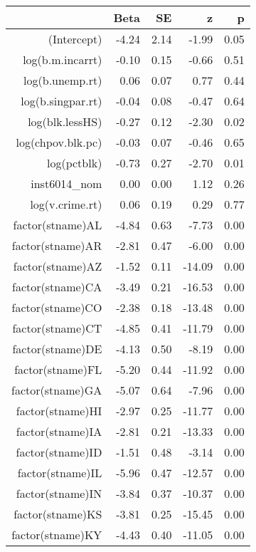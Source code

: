 \begin{table}[ht]
\centering
\begin{tabular}{rrrrr}
  \hline
 & Beta & SE & z & p \\ 
  \hline
(Intercept) & -4.24 & 2.14 & -1.99 & 0.05 \\ 
  log(b.m.incarrt) & -0.10 & 0.15 & -0.66 & 0.51 \\ 
  log(b.unemp.rt) & 0.06 & 0.07 & 0.77 & 0.44 \\ 
  log(b.singpar.rt) & -0.04 & 0.08 & -0.47 & 0.64 \\ 
  log(blk.lessHS) & -0.27 & 0.12 & -2.30 & 0.02 \\ 
  log(chpov.blk.pc) & -0.03 & 0.07 & -0.46 & 0.65 \\ 
  log(pctblk) & -0.73 & 0.27 & -2.70 & 0.01 \\ 
  inst6014\_nom & 0.00 & 0.00 & 1.12 & 0.26 \\ 
  log(v.crime.rt) & 0.06 & 0.19 & 0.29 & 0.77 \\ 
  factor(stname)AL & -4.84 & 0.63 & -7.73 & 0.00 \\ 
  factor(stname)AR & -2.81 & 0.47 & -6.00 & 0.00 \\ 
  factor(stname)AZ & -1.52 & 0.11 & -14.09 & 0.00 \\ 
  factor(stname)CA & -3.49 & 0.21 & -16.53 & 0.00 \\ 
  factor(stname)CO & -2.38 & 0.18 & -13.48 & 0.00 \\ 
  factor(stname)CT & -4.85 & 0.41 & -11.79 & 0.00 \\ 
  factor(stname)DE & -4.13 & 0.50 & -8.19 & 0.00 \\ 
  factor(stname)FL & -5.20 & 0.44 & -11.92 & 0.00 \\ 
  factor(stname)GA & -5.07 & 0.64 & -7.96 & 0.00 \\ 
  factor(stname)HI & -2.97 & 0.25 & -11.77 & 0.00 \\ 
  factor(stname)IA & -2.81 & 0.21 & -13.33 & 0.00 \\ 
  factor(stname)ID & -1.51 & 0.48 & -3.14 & 0.00 \\ 
  factor(stname)IL & -5.96 & 0.47 & -12.57 & 0.00 \\ 
  factor(stname)IN & -3.84 & 0.37 & -10.37 & 0.00 \\ 
  factor(stname)KS & -3.81 & 0.25 & -15.45 & 0.00 \\ 
  factor(stname)KY & -4.43 & 0.40 & -11.05 & 0.00 \\ 

\end{tabular}
\end{table}
